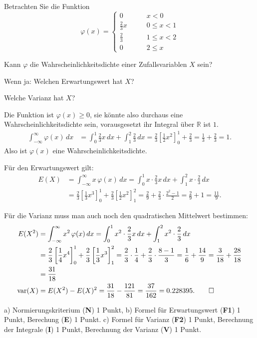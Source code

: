 Betrachten Sie die Funktion
\[
\varphi(x)=\begin{cases}
0&\qquad x < 0\\
\frac23x&\qquad 0\le x< 1\\
\frac23&\qquad 1\le x< 2\\
0&\qquad 2\le x
\end{cases}
\]
\begin{teilaufgaben}
\item Kann $\varphi$ die Wahrscheinlichkeitsdichte einer Zufallsvariablen
$X$ sein?
\item Wenn ja: Welchen Erwartungswert hat $X$?
\item Welche Varianz hat $X$?
\end{teilaufgaben}


\begin{loesung}
\begin{teilaufgaben}
\item Die Funktion ist $\varphi(x)\ge 0$, sie könnte also durchaus
eine Wahrscheinlichkeitsdichte sein, vorausgesetzt ihr Integral über
$\mathbb R$ ist $1$.
\begin{align*}
\int_{-\infty}^{\infty}\varphi(x)\,dx
&=
\int_0^1\frac23x\,dx
+\int_1^2\frac23\,dx
=\frac23\left[
\frac12x^2
\right]_0^1
+\frac23
=\frac13+\frac23=1.
\end{align*}
Also ist $\varphi(x)$ eine Wahrscheinlichkeitsdichte.
\item Für den Erwartungswert gilt:
\begin{align*}
E(X)
&=\int_{-\infty}^{\infty}x\,\varphi(x)\,dx
=
\int_0^1 x\cdot \frac23x\,dx + \int_1^2x\cdot \frac23\,dx
\\
&=
\frac23\left[ \frac13x^3 \right]_0^1 + \frac23\left[ \frac12x^2 \right]_1^2
=\frac29 + \frac23\cdot\frac{2^2-1}2
=\frac29 + 1=\frac{11}9.
\end{align*}
\item Für die Varianz muss man auch noch den quadratischen Mittelwert
bestimmen:
\begin{align*}
E(X^2)
&=
\int_{-\infty}^{\infty}x^2\,\varphi(x)\,dx
=
\int_0^1 x^2\cdot \frac23x\,dx + \int_1^2x^2\cdot \frac23\,dx
\\
&=
\frac23 \left[ \frac14 x^4 \right]_0^1
+\frac23 \left[ \frac13 x^3 \right]_1^2
=\frac23\cdot\frac14+\frac23\cdot\frac{8-1}3
=\frac16+\frac{14}9=\frac3{18}+\frac{28}{18}
\\
&=\frac{31}{18}
\\
\operatorname{var}(X)
&=
E(X^2)-E(X)^2
=\frac{31}{18}-\frac{121}{81}
=\frac{37}{162}
=0.228395.
\qedhere
\end{align*}
\end{teilaufgaben}
\end{loesung}

\begin{bewertung}
a) Normierungskriterium ({\bf N}) 1 Punkt,
b) Formel für Erwartungswert ({\bf F1}) 1 Punkt, Berechung ({\bf E}) 1 Punkt.
c) Formel für Varianz ({\bf F2}) 1 Punkt, Berechnung der Integrale ({\bf I})
1 Punkt, Berechnung der Varianz ({\bf V}) 1 Punkt.
\end{bewertung}
